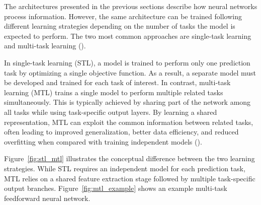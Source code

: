 The architectures presented in the previous sections describe how neural networks process information. However, the same architecture can be trained following different learning strategies depending on the number of tasks the 
model is expected to perform. The two most common approaches are single-task learning and multi-task learning (\cite{Zhang2022}).

In single-task learning (STL), a model is trained to perform only one prediction task by optimizing a single objective function. As a result, a separate model must be developed and trained for each task of interest. In contrast, 
multi-task learning (MTL) trains a single model to perform multiple related tasks simultaneously. This is typically achieved by sharing part of the network among all tasks while using task-specific output layers. By learning a
shared representation, MTL can exploit the common information between related tasks, often leading to improved generalization, better data efficiency, and reduced overfitting when compared with training 
independent models (\cite{Zhang2022}).

Figure~\ref{fig:stl_mtl} illustrates the conceptual difference between the two learning strategies. While STL requires an independent model for each prediction task, MTL relies on a shared feature extraction stage followed by 
multiple task-specific output branches. Figure~\ref{fig:mtl_example} shows an example multi-task feedforward neural network.

